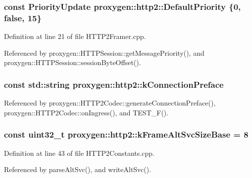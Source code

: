 \subsubsection[{Default\+Priority}]{ const {\bf Priority\+Update} proxygen\+::http2\+::\+Default\+Priority \{0, false, 15\}}\label{namespaceproxygen_1_1http2_a9d6bc6481640269a7770347be1f72fd5}


Definition at line 21 of file H\+T\+T\+P2\+Framer.\+cpp.



Referenced by proxygen\+::\+H\+T\+T\+P\+Session\+::get\+Message\+Priority(), and proxygen\+::\+H\+T\+T\+P\+Session\+::session\+Byte\+Offset().

\subsubsection[{k\+Connection\+Preface}]{\setlength{\rightskip}{0pt plus 5cm}const std\+::string proxygen\+::http2\+::k\+Connection\+Preface}\label{namespaceproxygen_1_1http2_a950486b7ccda737f4a916a30c1c299d8}


Referenced by proxygen\+::\+H\+T\+T\+P2\+Codec\+::generate\+Connection\+Preface(), proxygen\+::\+H\+T\+T\+P2\+Codec\+::on\+Ingress(), and T\+E\+S\+T\+\_\+\+F().

\subsubsection[{k\+Frame\+Alt\+Svc\+Size\+Base}]{\setlength{\rightskip}{0pt plus 5cm}const uint32\+\_\+t proxygen\+::http2\+::k\+Frame\+Alt\+Svc\+Size\+Base = 8}\label{namespaceproxygen_1_1http2_a43158adcefe2deb25c1db58c580279b1}


Definition at line 43 of file H\+T\+T\+P2\+Constants.\+cpp.



Referenced by parse\+Alt\+Svc(), and write\+Alt\+Svc().

